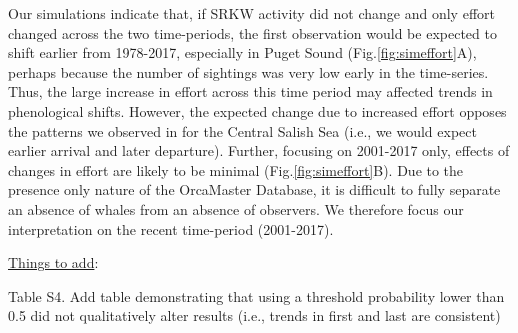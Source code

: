 \documentclass{article}
\begin{document}
\par Our simulations indicate that, if SRKW activity did not change and only effort changed across the two time-periods, the first observation would be expected to shift earlier from 1978-2017, especially in Puget Sound (Fig.\ref{fig:simeffort}A), perhaps because the number of sightings was very low early in the time-series. Thus, the large increase in effort across this time period may affected trends in phenological shifts.  However, the expected change due to increased effort opposes the patterns we observed in for the Central Salish Sea (i.e., we would expect earlier arrival and later departure). Further, focusing on 2001-2017 only, effects of changes in effort are likely to be minimal (Fig.\ref{fig:simeffort}B). Due to the presence only nature of the OrcaMaster Database, it is difficult to fully separate an absence of whales from an absence of observers. We therefore focus our interpretation on the recent time-period (2001-2017).



\par \underline{Things to add}:

\par Table S4. Add table demonstrating that using a threshold probability lower than 0.5 did not qualitatively alter results (i.e., trends in first and last are consistent)

\end{document}
